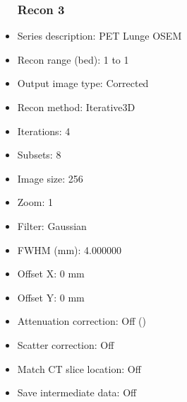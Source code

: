 \documentclass[12pt]{article}
\begin{document}
\begin{itemize}[noitemsep]
\subsubsection{Recon 3}
\item Series description: PET Lunge OSEM
\item Recon range (bed): 1 to 1
\item Output image type: Corrected
\item Recon method: Iterative3D
\item Iterations: 4
\item Subsets: 8
\item Image size: 256
\item Zoom: 1
\item Filter: Gaussian
\item FWHM (mm): 4.000000
\item Offset X: 0 mm
\item Offset Y: 0 mm
\item Attenuation correction: Off ()
\item Scatter correction: Off
\item Match CT slice location: Off
\item Save intermediate data: Off
\end{itemize}
\end{document}
